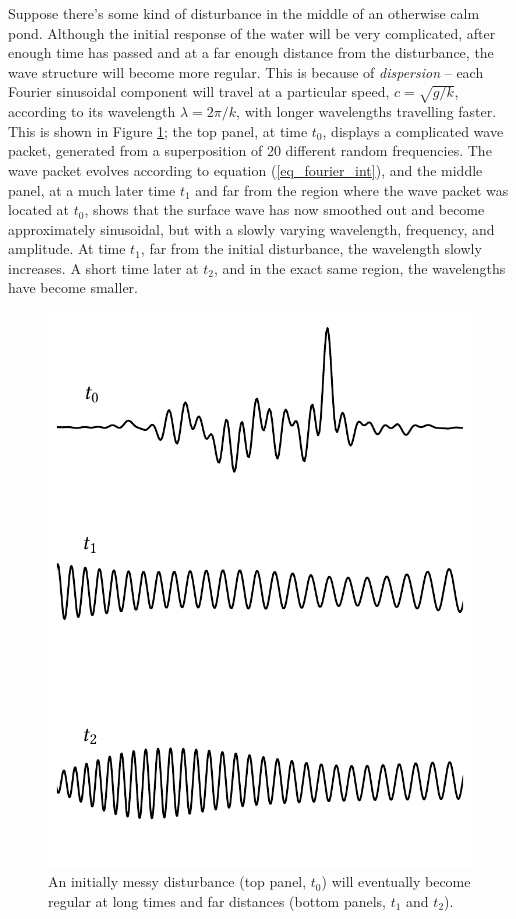 Suppose there's some kind of disturbance in the middle of an otherwise calm pond.  Although the initial response of the water will be very complicated, after enough time has passed and at a far enough distance from the disturbance, the wave structure will become more regular.  This is because of \emph{dispersion} -- each Fourier sinusoidal component will travel at a particular speed, $c = \sqrt{g/k}$, according to its wavelength $\lambda = 2\pi/k$, with longer wavelengths travelling faster. This is shown in Figure \ref{fig_long_response}; the top panel, at time $t_0$, displays  a complicated wave packet, generated from a superposition of 20 different random frequencies. The wave packet evolves according to equation (\ref{eq_fourier_int}), and the middle panel, at a much later time $t_1$ and far from the region where the wave packet was located at $t_0$, shows that the surface wave has now smoothed out and become approximately sinusoidal, but with a slowly varying wavelength, frequency, and amplitude.  At time $t_1$, far from the initial disturbance, the wavelength slowly increases.  A short time later at $t_2$, and in the exact same region, the wavelengths have become smaller.

\begin{figure}
\centering\includegraphics[width=0.7\linewidth]{Figures/Chapter5/fig_long_response}
\caption{An initially messy disturbance (top panel, $t_0$) will eventually become regular at long times and far distances (bottom panels, $t_1$ and $t_2$). }
\label{fig_long_response}
\end{figure}

